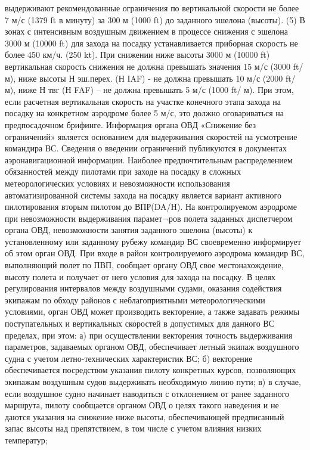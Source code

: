 выдерживают рекомендованные ограничения по вертикальной скорости не более 7 м/с (1379 ft в минуту) за 300 м (1000 ft) до заданного эшелона (высоты).
(5) В зонах с интенсивным воздушным движением в процессе снижения с эшелона 3000 м (10000 ft) для захода на посадку устанавливается приборная скорость не более 450 км/ч. (250 kt).
При снижении ниже высоты 3000 м (10000 ft) вертикальная скорость снижения не должна превышать значения 15 м/с (3000 ft/м), ниже высоты Н эш.перех. (Н IAF) - не должна превышать 10 м/с (2000 ft/ м), ниже Н твг (Н FAF) – не должна превышать 5 м/с (1000 ft/ м). При этом, если расчетная вертикальная скорость на участке конечного этапа захода на посадку на конкретном аэродроме более 5 м/с, это должно оговариваться на предпосадочном брифинге.
Информация органа ОВД «Снижение без ограничений» является основанием для выдерживания скоростей на усмотрение командира ВС.
Сведения о введении ограничений публикуются в документах аэронавигационной информации. 
Наиболее предпочтительным распределением обязанностей между пилотами при заходе на посадку в сложных метеорологических условиях и невозможности использования автоматизированной системы захода на посадку является вариант активного пилотирования вторым пилотом до ВПР(DA/H). 
На контролируемом аэродроме при невозможности выдерживания парамет¬ров полета заданных диспетчером органа ОВД, невозможности занятия заданного эшелона (высоты) к установленному или заданному рубежу командир ВС своевременно информирует об этом орган ОВД.
При входе в район контролируемого аэродрома командир ВС, выполняющий полет по ПВП, сообщает органу ОВД свое местонахождение, высоту полета и получает от него условия для захода на посадку.
В целях регулирования интервалов между воздушными судами, оказания содействия экипажам по обходу районов с неблагоприятными метеорологическими условиями, орган ОВД может производить векторение, а также задавать режимы поступательных и вертикальных скоростей в допустимых для данного ВС пределах, при этом:
а)	при осуществлении векторения точность выдерживания параметров, задаваемых органом ОВД, обеспечивает летный экипаж воздушного судна с учетом летно-технических характеристик ВС;
б)	векторение обеспечивается посредством указания пилоту конкретных курсов, позволяющих экипажам воздушным судов выдерживать необходимую линию пути; 
в)	в случае, если воздушное судно начинает наводиться с отклонением от ранее заданного маршрута, пилоту сообщается органом ОВД о целях такого наведения и не даются указания на снижение ниже высоты, обеспечивающей предписанный запас высоты над препятствием, в том числе с учетом влияния низких температур;
